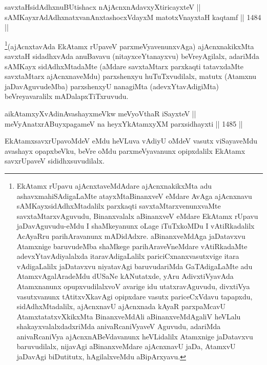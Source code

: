 \begin{shl}
savxtaHsidAdhxnuBUtishacx nAjAcnxnAdavxyXtiricayxteV || \\
sAMKayxrAdAdhxnatxvanAnxtashocxVdayxM matotxV\s nayxtaH kaqtamf ||  1484 ||  
\end{shl}

\begin{artha}
\footnote{EkAtamx rUpavu ajAcnxtaveMdAdare ajAcnxnakikxMta adu ashavxmahiSAdigaLaMte atayxMtaBinanxveV eMdare AvAga ajAcnxnavu sAMKayxsidAdhxMtadalilx parxkaqti savxtaMtarxvenunxvaMte savxtaMtarxvAguvudu, Binanxvalalx aBinanxveV eMdare EkAtamx rUpavu jaDavAguvudu-eMdu I shaMkeyanunx oLage iTuTxkoMDu I vAtiRkadalilx AcAyaRru parihAravanunx mADidAdxre. aBinanxveMdAga jaDatavxvu Atamxnige baruvudeMba shaMkege parihAraveVneMdare vAtiRkadaMte adevxYtavAdiyalalxda itaravAdigaLalilx pariciCxnanxvasutxvige itara vAdigaLalilx jaDatavxvu niyatavAgi baruvudariMda GaTAdigaLaMte adu AtamxvAgalAradeMdu dUSaNe kANutatxde, yAru AdivxtiVyavAda Atamxnanunx opupxvudilalxvoV avarige idu utatxravAguvudu, divxtiVya vasutxvanunx tAtitxvXkavAgi opipxdare vasutx pariceCxVdavu tapapxdu, sidAdhxMtadalilx, ajAcnxnavU ajAcnxnada kAyaR parxpaMcavU AtamxtatatxvXkikxMta BinanxveMdAli aBinanxveMdAgaliV heVLalu shakayxvalalxdadxriMda anivaRcaniVyaveV Aguvudu, adariMda anivaRcaniVya ajAcnxnABeVdavanunx heVLidalilx Atamxnige jaDatavxvu baruvudilalx, nijavAgi aBinanxveMdare ajAcnxnavU jaDa, AtamxvU jaDavAgi biDutitutx, hAgilalxveMdu aBipArxyavu.}(ajAcnxtavAda EkAtamx rUpaveV parxmeVyavenunxvAga) ajAcnxnakikxMta savxtaH sidadhxvAda anuBavavu (nitayxceYtanayxvu) beVreyAgilalx, adariMda sAMKayx sidAdhxMtadaMte (aMdare savxtaMtarx parxkaqti tatavxdaMte savxtaMtarx ajAcnxnaveMdu) parxshenxyu huTuTxvudilalx, matutx (Atamxnu jaDavAguvudeMba) parxshenxyU nanagiMta (adevxYtavAdigiMta) beVreyavaralilx mADalapxTiTxruvudu.
\end{artha}


\begin{shl}
aikAtamxyXvAdinA\s vashayxmeVkw meVyoV\s thaR iSayxteV ||  \\
meVyAnatxrABuyxpagameV na heyxYkAtamxyXM parxsidhayxti ||  1485 ||  
\end{shl}

\begin{artha}
EkAtamxsavxrUpavoMdeV eMdu heVLuva vAdiyU oMdeV vasutx viSayaveMdu avashayx opapxbeVku, beVre oMdu parxmeVyavanunx opipxdalilx EkAtamx savxrUpaveV sididhxsuvudilalx.
\end{artha}

